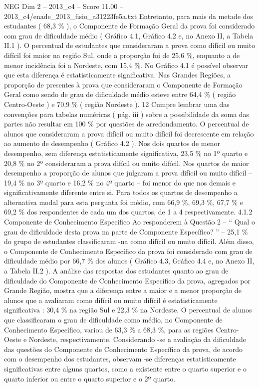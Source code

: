 \begin{textsample}{NEG Dim 2 – 2013\_c4 – Score 11.00 – 2013\_c4/enade\_2013\_fisio\_a31223fe5a.txt}
Entretanto, para mais da metade dos estudantes ( 68,3 \% ), o Componente de Formação Geral da prova foi considerado com grau de dificuldade médio ( Gráfico 4.1, Gráfico 4.2 e, no Anexo II, a Tabela II.1 ).
O percentual de estudantes que consideraram a prova como difícil ou muito difícil foi maior na região Sul, onde a proporção foi de 25,6 \%, enquanto a de menor incidência foi a Nordeste, com 15,4 \%.
No Gráfico 4.1 é possível observar que esta diferença é estatisticamente significativa.
Nas Grandes Regiões, a proporção de presentes à prova que consideraram o Componente de Formação Geral como sendo de grau de dificuldade médio esteve entre 64,4 \% ( região Centro-Oeste ) e 70,9 \% ( região Nordeste ). 12 Cumpre lembrar uma das convenções para tabelas numéricas ( pág. iii ) sobre a possibilidade da soma das partes não resultar em 100 \% por questões de arredondamento.
O percentual de alunos que consideraram a prova difícil ou muito difícil foi decrescente em relação ao aumento de desempenho ( Gráfico 4.2 ).
Nos dois quartos de menor desempenho, sem diferença estatisticamente significativa, 23,5 \% no 1º quarto e 20,8 \% no 2º consideraram a prova difícil ou muito difícil.
Nos quartos de maior desempenho a proporção de alunos que julgaram a prova difícil ou muito difícil – 19,4 \% no 3º quarto e 16,2 \% no 4º quarto – foi menor do que nos demais e significativamente diferente entre si.
Para todos os quartos de desempenho a alternativa modal para esta pergunta foi médio, com 66,9 \%, 69,3 \%, 67,7 \% e 69,2 \% dos respondentes de cada um dos quartos, de 1 a 4 respectivamente. 4.1.2 Componente de Conhecimento Específico Ao responderem à Questão 2 – “ Qual o grau de dificuldade desta prova na parte de Componente Específico? ” – 25,1 \% do grupo de estudantes classificaram -na como difícil ou muito difícil.
Além disso, o Componente de Conhecimento Específico da prova foi considerado com grau de dificuldade médio por 66,7 \% dos alunos ( Gráfico 4.3, Gráfico 4.4 e, no Anexo II, a Tabela II.2 ).
A análise das respostas dos estudantes quanto ao grau de dificuldade do Componente de Conhecimento Específico da prova, agregados por Grande Região, mostra que a diferença entre a maior e a menor proporção de alunos que a avaliaram como difícil ou muito difícil é estatisticamente significativa : 30,4 \% na região Sul e 22,3 \% na Nordeste.
O percentual de alunos que classificaram o grau de dificuldade como médio, no Componente de Conhecimento Específico, variou de 63,3 \% a 68,3 \%, para as regiões Centro-Oeste e Nordeste, respectivamente.
Considerando -se a avaliação da dificuldade das questões do Componente de Conhecimento Específico da prova, de acordo com o desempenho dos estudantes, observam -se diferenças estatisticamente significativas entre alguns quartos, como a existente entre o quarto superior e o quarto inferior ou entre o quarto superior e o 2º quarto.

\end{textsample}
